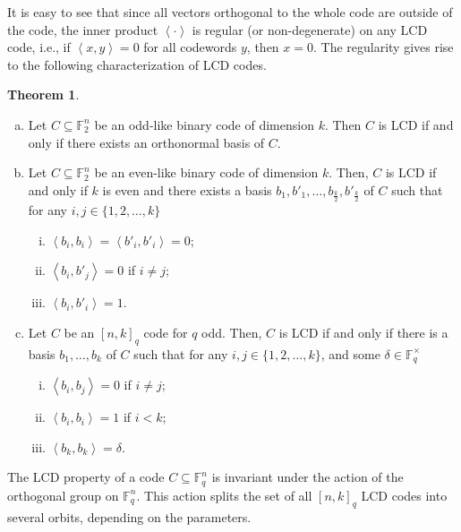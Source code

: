 \documentclass[11pt]{article}
\theoremstyle{definition}
\newtheorem{theorem}{Theorem}[section]
\newcommand{\F}{\mathbb{F}}
\newcommand{\Ang}[1]{\left\langle#1\right\rangle}
\begin{document}
It is easy to see that since all vectors orthogonal to the whole code are outside of the code, the inner product $\Ang{\cdot}$ is regular (or non-degenerate) on any LCD code, i.e., if $\Ang{x,y}=0$  for all codewords $y$, then $x=0$.
The regularity gives rise to the following characterization of LCD codes.

\begin{theorem}\cite[Theorems 3,5,25]{CMTQ18}
	\begin{enumerate}[(a)]
		\item Let $C\subseteq \F_2^n$ be an odd-like binary code of dimension $k$.
			Then $C$ is LCD if and only if there exists an orthonormal basis of $C$.
		\item Let $C\subseteq \F_2^n$ be an even-like binary code of dimension $k$.
			Then, $C$ is LCD if and only if $k$ is even and there exists a basis $b_1, b'_1, \ldots, b_{\frac{k}{2}},b'_{\frac{k}{2}}$ of $C$ such that for any $i, j \in \{1, 2, \ldots, k\}$
			\begin{enumerate}[(i)]
				\item $\Ang{b_i , b_i} = \Ang{b'_i, b'_i}=0$; 
				\item $\Ang{b_i , b'_j} = 0$ if $i \neq j$;
				\item $\Ang{b_i , b'_i} = 1$.
			\end{enumerate} 
		\item Let $C$ be an ${[n, k]}_q$ code for $q$ odd.
			Then, $C$ is LCD if and only if there is a basis $b_1, \ldots, b_k$ of $C$ such that for any $i, j \in \{1, 2, \ldots, k\}$, and some $\delta \in \F_q^\times$
			\begin{enumerate}[(i)]
				\item $\Ang{b_i , b_j} = 0$ if $i \neq j$; 
				\item $\Ang{b_i , b_i} = 1$ if $i<k$;
				\item $\Ang{b_k , b_k} = \delta$.
			\end{enumerate} 
	\end{enumerate}
\end{theorem}

The LCD property of a code $C\subseteq \F_q^n$ is invariant under the action of the orthogonal group on $\F_q^n$.
This action splits the set of all ${[n, k]}_q$ LCD codes into several orbits, depending on the parameters.
\end{document}
